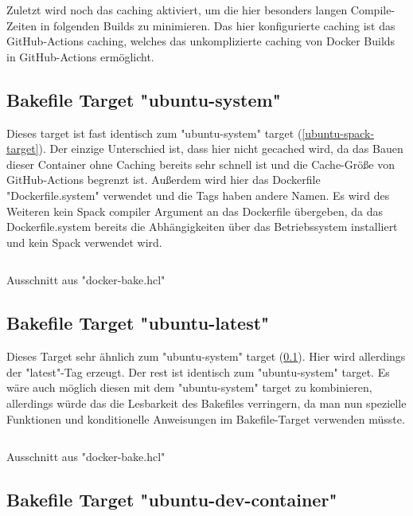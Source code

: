 Zuletzt wird noch das caching aktiviert, um die hier besonders langen Compile-Zeiten in folgenden Builds zu minimieren. Das hier konfigurierte caching ist das GitHub-Actions caching, welches das unkomplizierte caching von Docker Builds in GitHub-Actions ermöglicht.

\subsection{Bakefile Target "ubuntu-system"} \label{ubuntu-system-target}

Dieses target ist fast identisch zum "ubuntu-system" target (\cref{ubuntu-spack-target}). Der einzige Unterschied ist, dass hier nicht gecached wird, da das Bauen dieser Container ohne Caching bereits sehr schnell ist und die Cache-Größe von GitHub-Actions begrenzt ist. Außerdem wird hier das Dockerfile "Dockerfile.system" verwendet und die Tags haben andere Namen. Es wird des Weiteren kein Spack compiler Argument an das Dockerfile übergeben, da das Dockerfile.system bereits die Abhängigkeiten über das Betriebssystem installiert und kein Spack verwendet wird. 

\begin{listing}[H]
    \inputminted[firstline=35,lastline=50]{./lexers/docker-bake-lexer.py}{./code-examples/docker-bake.hcl}
    \caption{Ausschnitt aus "docker-bake.hcl"}
\end{listing}

\subsection{Bakefile Target "ubuntu-latest"}

Dieses Target sehr ähnlich zum "ubuntu-system" target (\cref{ubuntu-system-target}). Hier wird allerdings der "latest"-Tag erzeugt. 
Der rest ist identisch zum "ubuntu-system" target. Es wäre auch möglich diesen mit dem "ubuntu-system" target zu kombinieren, allerdings würde das die Lesbarkeit des Bakefiles verringern, da man nun spezielle Funktionen und konditionelle Anweisungen im Bakefile-Target verwenden müsste.

\begin{listing}[H]
    \inputminted[firstline=52,lastline=62]{./lexers/docker-bake-lexer.py}{./code-examples/docker-bake.hcl}
    \caption{Ausschnitt aus "docker-bake.hcl"}
\end{listing}

\subsection{Bakefile Target "ubuntu-dev-container"}

